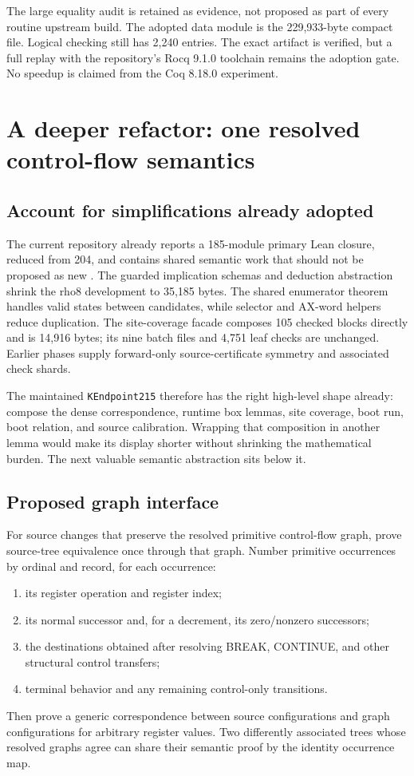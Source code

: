 \documentclass[11pt]{article}
\begin{document}
The large equality audit is retained as evidence, not proposed as part of every routine upstream build. The adopted data module is the 229,933-byte compact file. Logical checking still has 2,240 entries. The exact artifact is verified, but a full replay with the repository's Rocq 9.1.0 toolchain remains the adoption gate. No speedup is claimed from the Coq 8.18.0 experiment.

\section{A deeper refactor: one resolved control-flow semantics}

\subsection{Account for simplifications already adopted}

The current repository already reports a 185-module primary Lean closure, reduced from 204, and contains shared semantic work that should not be proposed as new \cite{phase3}. The guarded implication schemas and deduction abstraction shrink the rho8 development to 35,185 bytes. The shared enumerator theorem handles valid states between candidates, while selector and AX-word helpers reduce duplication. The site-coverage facade composes 105 checked blocks directly and is 14,916 bytes; its nine batch files and 4,751 leaf checks are unchanged. Earlier phases supply forward-only source-certificate symmetry and associated check shards.

The maintained \texttt{KEndpoint215} therefore has the right high-level shape already: compose the dense correspondence, runtime box lemmas, site coverage, boot run, boot relation, and source calibration. Wrapping that composition in another lemma would make its display shorter without shrinking the mathematical burden. The next valuable semantic abstraction sits below it.

\subsection{Proposed graph interface}

For source changes that preserve the resolved primitive control-flow graph, prove source-tree equivalence once through that graph. Number primitive occurrences by ordinal and record, for each occurrence:
\begin{enumerate}
\item its register operation and register index;
\item its normal successor and, for a decrement, its zero/nonzero successors;
\item the destinations obtained after resolving BREAK, CONTINUE, and other structural control transfers;
\item terminal behavior and any remaining control-only transitions.
\end{enumerate}
Then prove a generic correspondence between source configurations and graph configurations for arbitrary register values. Two differently associated trees whose resolved graphs agree can share their semantic proof by the identity occurrence map.
\end{document}

